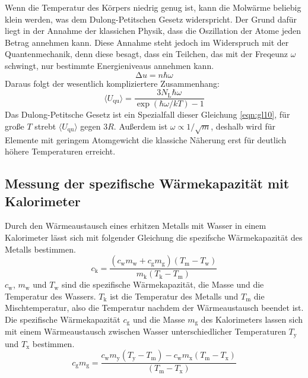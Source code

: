 Wenn die Temperatur des Körpers niedrig genug ist, kann die Molwärme beliebig klein werden, was dem Dulong-Petitschen Gesetz widerspricht.
Der Grund dafür liegt in der Annahme der klassichen Physik, dass die Oszillation der Atome jeden Betrag annehmen kann.
Diese Annahme steht jedoch im Widerspruch mit der Quantenmechanik, denn diese besagt, dass ein Teilchen, das mit der Freqeunz $\omega$ schwingt, nur bestimmte Energieniveaus annehmen kann.
\begin{equation}
  \increment u = n \hbar \omega
  \label{eqn:gl9}
\end{equation}
Daraus folgt der wesentlich kompliziertere Zusammenhang:
\begin{equation}
  \langle U_\text{qu} \rangle = \frac{3 N_\text{L} \hbar \omega}{\exp(\hbar \omega / k T) - 1}
  \label{eqn:gl10}
\end{equation}
Das Dulong-Petitsche Gesetz ist ein Spezialfall dieser Gleichung \eqref{eqn:gl10}, für große $T$ strebt $\langle U_\text{qu} \rangle$ gegen $3 R$.
Außerdem ist $\omega \propto 1/\sqrt{m}$, deshalb wird für Elemente mit geringem Atomgewicht die klassiche Näherung erst für deutlich höhere Temperaturen erreicht.

\subsection{Messung der spezifische Wärmekapazität mit Kalorimeter}
\label{sec:wärmeaustausch}

Durch den Wärmeaustausch eines erhitzen Metalls mit Wasser in einem Kalorimeter lässt sich mit folgender Gleichung die spezifsche Wärmekapazität des Metalls bestimmen.
\begin{equation}
  c_\text{k} = \frac{(c_\text{w} m_\text{w} + c_\text{g} m_\text{g}) (T_\text{m} - T_\text{w})}{m_\text{k} (T_\text{k} - T_\text{m})}
  \label{eqn:gl11}
\end{equation}
$c_\text{w}$, $m_\text{w}$ und $T_\text{w}$ sind die spezifische Wärmekapazität, die Masse und die Temperatur des Wassers.
$T_\text{k}$ ist die Temperatur des Metalls und $T_\text{m}$ die Mischtemperatur, also die Temperatur nachdem der Wärmeaustausch beendet ist.
Die spezifische Wärmekapazität $c_\text{g}$ und die Masse $m_\text{g}$ des Kalorimeters lassen sich mit einem Wärmeaustausch zwischen Wasser unterschiedlicher Temperaturen $T_\text{y}$ und $T_\text{x}$ bestimmen.
\begin{equation}
  c_\text{g} m_\text{g} = \frac{c_\text{w} m_\text{y} (T_\text{y} - T_\text{m}) - c_\text{w} m_\text{x} (T_\text{m} - T_\text{x})}{(T_\text{m} - T_\text{x})}
  \label{eqn:gl12}
\end{equation}
